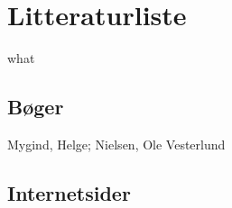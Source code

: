 \section{Litteraturliste}
what
\subsection*{Bøger}
Mygind, Helge; Nielsen, Ole Vesterlund 

\subsection*{Internetsider}